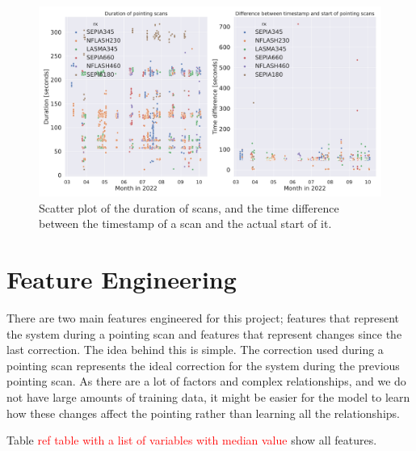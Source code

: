 \begin{figure}[H]
    \centering
    \includegraphics[width=1.1\textwidth]{Tiltmeter plots/scan_duration_distribution_date.pdf}
    \caption[Scatter plot with pointing scan duration and start time throughout 2022.]{Scatter plot of the duration of scans, and the time difference between the timestamp of a scan and the actual start of it.}
    \label{fig:scan_times_date}
\end{figure}




\section{Feature Engineering}\label{sec:feature_engineering}
There are two main features engineered for this project; features that represent the system during a pointing scan and features that represent changes since the last correction. 
The idea behind this is simple. The correction used during a pointing scan represents the ideal correction for the system during the previous pointing scan.
As there are a lot of factors and complex relationships, and we do not have large amounts of training data, it might be easier for the model to learn 
how these changes affect the pointing rather than learning all the relationships.

Table \textcolor{red}{ref table with a list of variables with median value} show all features.



